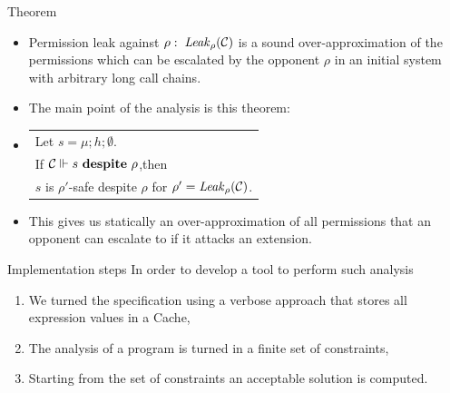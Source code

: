 \documentclass[11pt]{beamer}
\begin{document}
\begin{frame}{Theorem}
\begin{itemize}
\item[] Permission leak against $\rho: \; \mathit{Leak}_{\rho}({\cal C})$ is a sound over-approximation of the permissions which can be escalated by the opponent $\rho$ in an initial system with arbitrary long call chains.
\item[] The main point of the analysis is this theorem:
\item[]
\begin{center}
\begin{tabular}{|l|}
\hline
Let $s = \mu;h;\emptyset$.\\If ${\cal C} \Vdash s \ \mathbf{despite}\ \rho$,then\\$s$ is $\rho'$-safe despite $\rho$ for $\rho' = \mathit{Leak}_{\rho}({\cal C})$. \\
\hline
\end{tabular}
\end{center}
\item[] This gives us statically an over-approximation of all permissions that an opponent can escalate to if it attacks an extension. 
\end{itemize}
\end{frame}


\begin{frame}{Implementation steps}
In order to develop a tool to perform such analysis
\begin{enumerate}
\item We turned the specification using a verbose approach that stores all expression values in a Cache,
\item The analysis of a program is turned in a finite set of constraints,
\item Starting from the set of constraints an acceptable solution is computed.
\end{enumerate}
\end{frame}


\newcommand{\absCV}{\mathcal{CV}}
\newcommand{\cenvs}{\absCV}
\newcommand{\Cat}[0]{\absCV_{\hat{C}}}
\newcommand{\muat}[0]{\absCV_{\hat{\mu}}}
\newcommand{\Env}[0]{\absCV_{\hat{\Gamma}}}
\newcommand{\Pat}[0]{\absCV_{\hat{P}}}
\newcommand{\Phiat}[0]{\absCV_{\hat{\Phi}}}
\newcommand{\Upsat}[0]{\absCV_{\hat{\Upsilon}}}
\newcommand{\ccest}[1]{\cenvs \Vdash_{cv, \rho_s} #1}
\newcommand{\ccestl}[1]{\cenvs \Vdash_{cv, \rho_s} {(#1)}^{\alpha}}
\newcommand{\lbt}[1]{{e_#1}^{\alpha_#1}}
\newcommand{\all}{\alpha}
\end{document}
